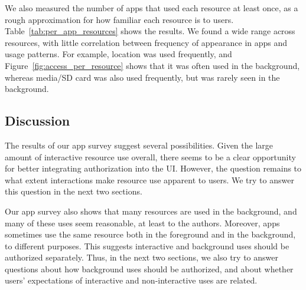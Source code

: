 We also measured the number of apps that used each resource at least
once, as a rough approximation for how familiar each resource is to
users.
Table~\ref{tab:per_app_resources} shows the results.
We found a 
wide range across resources, with little correlation between frequency of 
appearance in apps and usage patterns. For example, location was used 
frequently, and Figure~\ref{fig:access_per_resource} 
shows that it was often used in the background,
whereas media/SD card was also used frequently, but was rarely 
seen in the background.


\subsection{Discussion}

The results of our app survey suggest several
possibilities. Given the large amount of interactive resource use
overall, there seems to be a clear opportunity for better integrating
authorization into the UI. However, the question remains to what extent 
interactions make resource use apparent to users. We try to answer
this question in the next two sections.

Our app survey also shows that many resources are used in the
background, and many of these uses seem reasonable, at least to the
authors. Moreover, apps sometimes use the same resource both
in the foreground and in the background, to different purposes.
This suggests interactive and background uses should be authorized separately.
Thus,
in the next two sections, we also try to answer questions about how
background uses should be authorized, and about whether users'
expectations of interactive and non-interactive uses are related.

